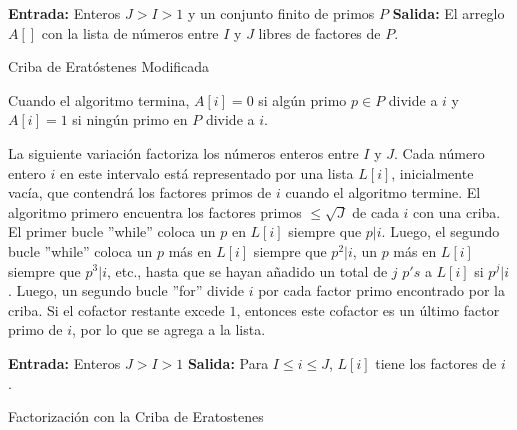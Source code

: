         \begin{algorithm}[H]
            \SetAlgoLined
            \textbf{Entrada:} Enteros $J > I > 1$ y un conjunto finito de primos $P$\;
            \textbf{Salida:} El arreglo $A[]$ con la lista de números entre $I$ y $J$ libres de factores de $P$.\ 
            \caption{Criba de Eratóstenes Modificada}
        \end{algorithm}

        Cuando el algoritmo termina, $A[i] = 0$ si algún primo $p \in P$ divide a $i$ y $A[i] = 1$ si ningún primo en $P$ divide a $i$.

        La siguiente variación factoriza los números enteros entre $I$ y $J$. Cada número entero $i$ en este intervalo está representado por una lista $L[i]$, inicialmente vacía, que contendrá los factores primos de $i$ cuando el algoritmo termine. El algoritmo primero encuentra los factores primos $\leq \sqrt{J}$ de cada $i$ con una criba. El primer bucle ''while'' coloca un $p$ en $L[i]$ siempre que $p | i$. Luego, el segundo bucle ''while'' coloca un $p$ más en $L[i]$ siempre que $p^2 | i$, un $p$ más en $L[i]$ siempre que $p^3 | i$, etc., hasta que se hayan añadido un total de $j$ $p's$ a $L[i]$ si $p^j | i$. Luego, un segundo bucle ''for'' divide $i$ por cada factor primo encontrado por la criba. Si el cofactor restante excede $1$, entonces este cofactor es un último factor primo de $i$, por lo que se agrega a la lista.

        \begin{algorithm}[H]
            \SetAlgoLined
            \textbf{Entrada:} Enteros $J > I > 1$\;
            \textbf{Salida:} Para $I \leq i \leq J$, $L[i]$ tiene los factores de $i$.\ 
            \caption{Factorización con la Criba de Eratostenes}
        \end{algorithm}

